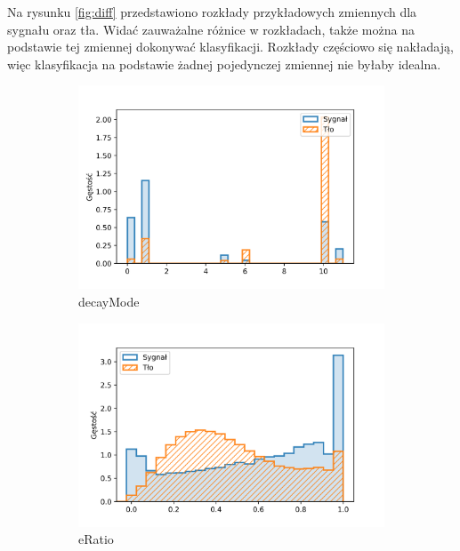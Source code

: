 \documentclass{pracalicmgr}
\begin{document}
	Na rysunku \ref{fig:diff} przedstawiono rozkłady przykładowych zmiennych dla sygnału oraz tła. Widać zauważalne różnice w rozkładach, także można na podstawie tej zmiennej dokonywać klasyfikacji. Rozkłady częściowo się nakładają, więc klasyfikacja na podstawie żadnej pojedynczej zmiennej nie byłaby idealna.
	
	\begin{figure}
	\begin{subfigure}{.5\textwidth}
	\centering
	\includegraphics[width=1\textwidth]{difference_decayMode.png}
	\caption{decayMode}
	\end{subfigure}
	\begin{subfigure}{.5\textwidth}
	\centering
	\includegraphics[width=1\textwidth]{difference_eRatio.png}
	\caption{eRatio}
	\end{subfigure}
	\begin{subfigure}{.5\textwidth}
	\centering

\end{subfigure}
\end{figure}
\end{document}
